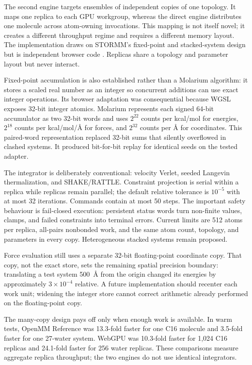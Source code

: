 The second engine targets ensembles of independent copies of one topology. It
maps one replica to each GPU workgroup, whereas the direct engine distributes
one molecule across atom-owning invocations. This mapping is not itself novel;
it creates a different throughput regime and requires a different memory layout.
The implementation draws on STORMM's fixed-point and stacked-system design but
is independent browser code \cite{cerutti2024stormm}. Replicas share a topology
and parameter layout but never interact.

Fixed-point accumulation is also established rather than a Molarium algorithm:
it stores a scaled real number as an integer so concurrent additions can use
exact integer operations. Its browser adaptation was consequential because WGSL
exposes 32-bit integer atomics. Molarium represents each signed 64-bit
accumulator as two 32-bit words and uses $2^{22}$ counts per kcal/mol for
energies, $2^{18}$ counts per kcal/mol/\AA{} for forces, and $2^{32}$ counts per
\AA{} for coordinates. This paired-word representation replaced 32-bit sums
that silently overflowed in clashed systems. It produced bit-for-bit replay for
identical seeds on the tested adapter.

The integrator is deliberately conventional: velocity Verlet, seeded Langevin
thermalization, and SHAKE/RATTLE. Constraint projection is serial within a
replica while replicas remain parallel; the default relative tolerance is
$10^{-5}$ with at most 32 iterations. Commands contain at most 50 steps. The
important safety behaviour is fail-closed execution: persistent status words
turn non-finite values, clamps, and failed constraints into terminal errors.
Current limits are 512 atoms per replica, all-pairs nonbonded work, and the same
atom count, topology, and parameters in every copy. Heterogeneous stacked
systems remain proposed.

Force evaluation still uses a separate 32-bit floating-point coordinate copy.
That copy, not the exact store, sets the remaining spatial precision boundary:
translating a test system 500~\AA{} from the origin changed its energies by
approximately $3\times10^{-4}$ relative. A future implementation should recenter
each work unit; widening the integer store cannot correct arithmetic already
performed on the floating-point copy.

The many-copy design pays off only when enough work is available. In warm tests,
OpenMM Reference was 13.3-fold faster for one C16 molecule and 3.5-fold faster
for one 27-water system. WebGPU was 10.3-fold faster for 1,024 C16 replicas and
24.1-fold faster for 256 water replicas. These comparisons measure aggregate
replica throughput; the two engines do not use identical integrators.

